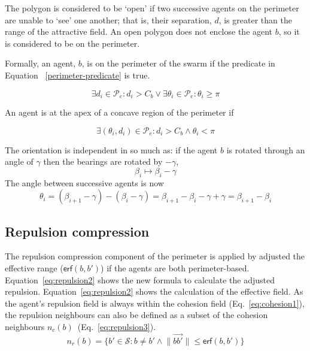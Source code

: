 \documentclass[12pt,a4paper]{IEEEtran}
\begin{document}
The polygon is considered to be `open' if two successive agents on the perimeter are unable to `see' one another; that is, their separation, $d$, is greater than the range of the attractive field.  An open polygon does not enclose the agent $b$, so it is considered to be on the perimeter. 

Formally, an agent, $b$, is on the perimeter of the swarm if the predicate in Equation ~\ref{perimeter-predicate} is true.

\begin{equation}
\exists d_i\in\mathcal{P}_e:d_i>C_b \vee
\exists\theta_i\in\mathcal{P}_e:\theta_i\geq\pi
\label{perimeter-predicate}
\end{equation}

An agent is at the apex of a concave region of the perimeter if

\begin{equation}
\exists(\theta_i,d_i)\in\mathcal{P}_e : d_i>C_b\wedge\theta_i<\pi
\label{concave-predicate}
\end{equation}

The orientation is independent in so much as: if the agent $b$ is rotated through an angle of $\gamma$ then the bearings are rotated by $-\gamma$, \[ \beta_i\mapsto\beta_i-\gamma \] The  angle between successive agents is now
\footnotesize
\[
\theta_i  =  (\beta_{i+1}-\gamma) - (\beta_i-\gamma)
= \beta_{i+1}-\beta_i-\gamma+\gamma
= \beta_{i+1}-\beta_i
\]
\normalsize

\subsection{Repulsion compression}\label{repulsion:compression}
The repulsion compression component of the perimeter is applied by adjusted the effective range ($\mathsf{erf}(b,b')$) if the agents are both perimeter-based. Equation~\ref{eq:repulsion2} shows the new formula to calculate the adjusted repulsion. Equation~\ref{eq:repulsion2} shows the calculation of the effective field. As the agent's repulsion field is always within the cohesion field (Eq.~\ref{eq:cohesion1}), the repulsion neighbours can also be defined as a subset of the cohesion neighbours $n_c(b)$~(Eq.~\ref{eq:repulsion3}).\\

\begin{equation}\label{eq:repulsion1}
n_r(b) = \{b' \in \mathcal{S} : b \neq b' \land \lVert\vec{b b'}\rVert \leq \mathsf{erf}(b,b')\}
\end{equation}
\end{document}
